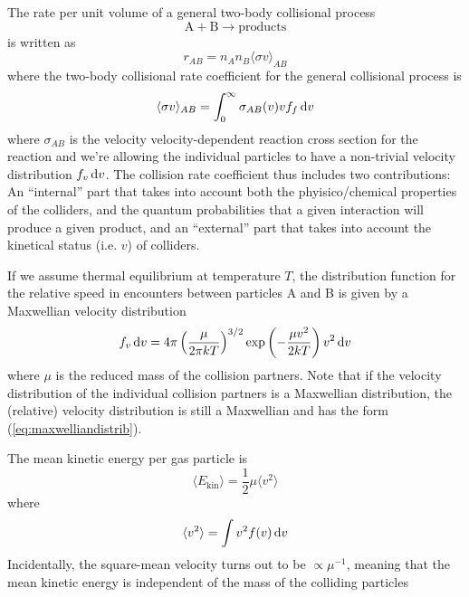 The rate per unit volume of a general two-body collisional process 
\begin{equation*}
    \text{A} + \text{B} \to \text{products}
\end{equation*}
is written as
\begin{equation}
    r_{AB} = n_{A}n_{B}\langle \sigma v \rangle_{AB}
\end{equation}
where the two-body collisional rate coefficient for the general collisional process is 
\begin{equation}
    \langle \sigma v \rangle_{AB} = \int_{0}^{\infty} \sigma_{AB}(v)vf_{f}\,\text{d}v
    \label{eq:collisionalratecoeff}
\end{equation}
where $\sigma_{AB}$ is the velocity velocity-dependent reaction cross section for the reaction and we're allowing the individual particles to have a non-trivial velocity distribution $f_{v}\,\text{d}v$. The collision rate coefficient thus includes two contributions: An “internal” part that takes into account both the phyisico/chemical properties of the colliders, and the quantum probabilities that a given interaction will produce a given product, and an “external” part that takes into account the kinetical status (i.e. $v$) of colliders.
\par If we assume thermal equilibrium at temperature $T$, the distribution function for the relative speed in encounters between particles A and B is given by a Maxwellian velocity distribution
\begin{equation}
    f_{v}\,\text{d}v = 4\pi \left(\frac{\mu}{2\pi kT}\right)^{3/2}\exp\left(-\frac{\mu v^{2}}{2kT}\right)v^{2}\,\text{d}v
    \label{eq:maxwelliandistrib}
\end{equation}
where $\mu$ is the reduced mass of the collision partners. Note that if the velocity distribution of the individual collision partners is a Maxwellian distribution, the (relative) velocity distribution is still a Maxwellian and has the form (\ref{eq:maxwelliandistrib}).
\par The mean kinetic energy per gas particle is 
\begin{equation*}
    \langle E_{\text{kin}} \rangle = \frac{1}{2}\mu \langle v^{2} \rangle
\end{equation*}
where 
\begin{equation*}
    \langle v^{2} \rangle = \int v^{2}f(v)\,\text{d}v
\end{equation*}
Incidentally, the square-mean velocity turns out to be $\propto \mu^{-1}$, meaning that the mean kinetic energy is independent of the mass of the colliding particles 
